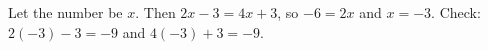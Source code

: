 Let the number be $x$. Then $2x-3=4x+3$, so $-6=2x$ and $x=\boxed{-3}$. Check: $2(-3)-3=-9$ and $4(-3)+3=-9$.
